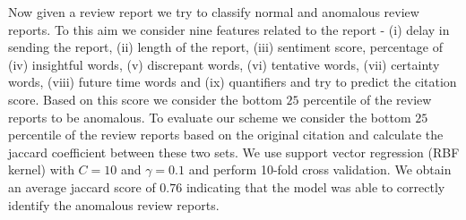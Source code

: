 \noindent
Now given a review report we try to classify normal and anomalous review reports. To this aim we consider nine features related to the report - (i) delay in sending the report, (ii) length of the report, (iii) sentiment score, percentage of (iv) insightful words, (v) discrepant words, (vi) tentative words, (vii) certainty words, (viii) future time words and (ix) quantifiers and try to predict the citation score. Based on this score we consider the bottom $25$ percentile of the review reports to be anomalous. To evaluate our scheme we consider the bottom $25$ percentile of the review reports based on the original citation and calculate the jaccard coefficient between these two sets.
We use support vector regression (RBF kernel) with $C=10$ and $\gamma=0.1$ and perform 10-fold cross validation. We obtain an average jaccard score of {\bf $0.76$} indicating that the model was able to correctly identify the anomalous review reports. 
\medskip